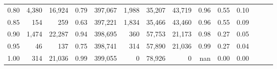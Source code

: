 \begin{tabular}{rrrrrrrrrrrrrr}
0.80 &   4,380 &  16,924 &  0.79 &  397,067 &    1,988 &  35,207 &  43,719 &  0.96 &  0.55 &      0.10 \\
0.85 &     154 &     259 &  0.63 &  397,221 &    1,834 &  35,466 &  43,460 &  0.96 &  0.55 &      0.09 \\
0.90 &   1,474 &  22,287 &  0.94 &  398,695 &      360 &  57,753 &  21,173 &  0.98 &  0.27 &      0.05 \\
0.95 &      46 &     137 &  0.75 &  398,741 &      314 &  57,890 &  21,036 &  0.99 &  0.27 &      0.04 \\
1.00 &     314 &  21,036 &  0.99 &  399,055 &        0 &  78,926 &       0 &   nan &  0.00 &      0.00 \\
\bottomrule
\end{tabular}
